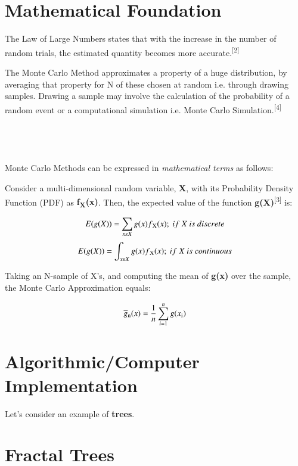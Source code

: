 \documentclass{resonance}
\begin{document}
\section*{Mathematical Foundation}
The Law of Large Numbers states that with the increase in the number of random trials, the estimated quantity becomes more accurate.\textsuperscript{[2]}

The Monte Carlo Method approximates a property of a huge distribution, by averaging that property for N of these chosen at random i.e. through drawing samples. Drawing a sample may involve the calculation of the probability of a random event or a computational simulation i.e. Monte Carlo Simulation.\textsuperscript{[4]}\\\\\\\\\\

\pagebreak
\setlength{\leftskip}{-4cm}
Monte Carlo Methods can be expressed in \textit{mathematical terms} as follows:

Consider a multi-dimensional random variable, \textbf{X}, with its Probability Density Function (PDF) as \textbf{f\textsubscript{X}(x)}. Then, the expected value of the function \textbf{g(X)}\textsuperscript{[3]} is:

$$E(g(X)) = \sum_{x\varepsilon X} g(x)f\textsubscript{X}(x);\ if\ X\ is\ discrete$$
$$E(g(X)) = \int_{x\varepsilon X} g(x)f\textsubscript{X}(x);\ if\ X\ is\ continuous$$

Taking an N-sample of X’s, and computing the mean of \textbf{g(x)} over the sample, the Monte Carlo Approximation equals:

$$ \overline{g}\textsubscript{n}(x) = \frac{1}{n} \sum_{i=1}^{n}g(x\textsubscript{i}) $$

\section*{Algorithmic/Computer Implementation}
Let's consider an example of \textbf{trees}.


\setlength{\leftskip}{0cm}
\section{Fractal Trees}

\end{document}
